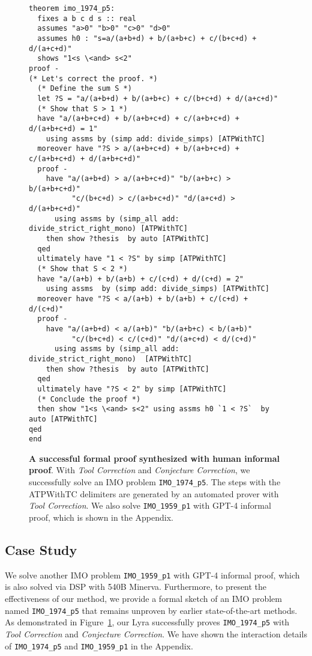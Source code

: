 \documentclass{article} \usepackage{iclr2024_conference,times}
\def\methodOneFull{\textit{Tool Correction}\xspace}
\def\methodTwoFull{\textit{Conjecture Correction}\xspace}
\def\shortname{Lyra\xspace}
\begin{document}
\begin{figure}[t]
\begin{tcolorbox}[colback=mybrown!5!white,colframe=mybrown!75!black]
\begin{tiny}
\begin{lstlisting}[style=isabelle]
theorem imo_1974_p5:
  fixes a b c d s :: real
  assumes "a>0" "b>0" "c>0" "d>0"
  assumes h0 : "s=a/(a+b+d) + b/(a+b+c) + c/(b+c+d) + d/(a+c+d)"
  shows "1<s \<and> s<2"
proof -
(* Let's correct the proof. *)
  (* Define the sum S *)
  let ?S = "a/(a+b+d) + b/(a+b+c) + c/(b+c+d) + d/(a+c+d)"
  (* Show that S > 1 *)
  have "a/(a+b+c+d) + b/(a+b+c+d) + c/(a+b+c+d) + d/(a+b+c+d) = 1" 
    using assms by (simp add: divide_simps) [ATPWithTC]
  moreover have "?S > a/(a+b+c+d) + b/(a+b+c+d) + c/(a+b+c+d) + d/(a+b+c+d)" 
  proof -
    have "a/(a+b+d) > a/(a+b+c+d)" "b/(a+b+c) > b/(a+b+c+d)" 
          "c/(b+c+d) > c/(a+b+c+d)" "d/(a+c+d) > d/(a+b+c+d)"
      using assms by (simp_all add: divide_strict_right_mono) [ATPWithTC]
    then show ?thesis  by auto [ATPWithTC]
  qed
  ultimately have "1 < ?S" by simp [ATPWithTC]
  (* Show that S < 2 *)
  have "a/(a+b) + b/(a+b) + c/(c+d) + d/(c+d) = 2" 
    using assms  by (simp add: divide_simps) [ATPWithTC]
  moreover have "?S < a/(a+b) + b/(a+b) + c/(c+d) + d/(c+d)"
  proof -
    have "a/(a+b+d) < a/(a+b)" "b/(a+b+c) < b/(a+b)" 
          "c/(b+c+d) < c/(c+d)" "d/(a+c+d) < d/(c+d)"
      using assms by (simp_all add: divide_strict_right_mono)  [ATPWithTC]
    then show ?thesis  by auto [ATPWithTC]
  qed
  ultimately have "?S < 2" by simp [ATPWithTC]
  (* Conclude the proof *)
  then show "1<s \<and> s<2" using assms h0 `1 < ?S`  by auto [ATPWithTC]
qed
end

\end{lstlisting}
\end{tiny}
\end{tcolorbox}
\caption{
\small
\textbf{A successful formal proof synthesized with human informal proof}. With \methodOneFull and \methodTwoFull, we successfully solve an IMO problem \texttt{IMO\_1974\_p5}. The steps with the \textcolor{patriarch}{ATPWithTC} delimiters are generated by an automated prover with \methodOneFull. We also solve \texttt{IMO\_1959\_p1} with GPT-4 informal proof, which is shown in the Appendix. 
}
\vspace{-20pt}
\label{fig:case_study}
\end{figure}

\subsection{Case Study}

We solve another IMO problem \texttt{IMO\_1959\_p1} with GPT-4 informal proof, which is also solved via DSP with 540B Minerva. Furthermore, to present the effectiveness of our method, we provide a formal sketch of an IMO problem named \texttt{IMO\_1974\_p5} that remains unproven by earlier state-of-the-art methods. As demonstrated in Figure~\ref{fig:case_study}, our \shortname successfully proves \texttt{IMO\_1974\_p5} with \methodOneFull and \methodTwoFull. We have shown the interaction details of \texttt{IMO\_1974\_p5} and \texttt{IMO\_1959\_p1} in the Appendix. 
\end{document}
